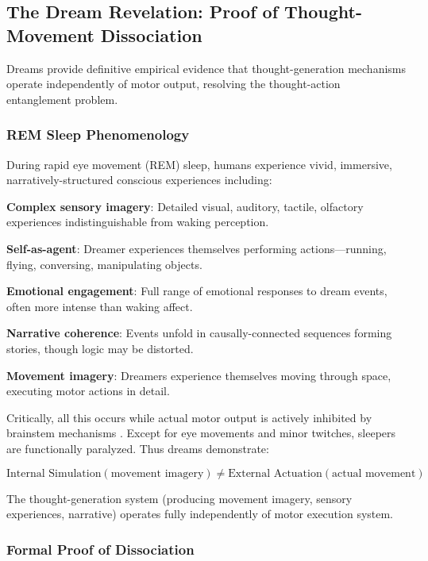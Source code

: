 \documentclass[11pt,onecolumn]{article}
\begin{document}
\subsection{The Dream Revelation: Proof of Thought-Movement Dissociation}

Dreams provide definitive empirical evidence that thought-generation mechanisms operate independently of motor output, resolving the thought-action entanglement problem.

\subsubsection{REM Sleep Phenomenology}

During rapid eye movement (REM) sleep, humans experience vivid, immersive, narratively-structured conscious experiences \citep{hobson2009rem} including:

\textbf{Complex sensory imagery}: Detailed visual, auditory, tactile, olfactory experiences indistinguishable from waking perception.

\textbf{Self-as-agent}: Dreamer experiences themselves performing actions---running, flying, conversing, manipulating objects.

\textbf{Emotional engagement}: Full range of emotional responses to dream events, often more intense than waking affect.

\textbf{Narrative coherence}: Events unfold in causally-connected sequences forming stories, though logic may be distorted.

\textbf{Movement imagery}: Dreamers experience themselves moving through space, executing motor actions in detail.

Critically, all this occurs while actual motor output is actively inhibited by brainstem mechanisms \citep{chase2008control}. Except for eye movements and minor twitches, sleepers are functionally paralyzed. Thus dreams demonstrate:

\begin{equation}
\text{Internal Simulation}(\text{movement imagery}) \neq \text{External Actuation}(\text{actual movement})
\end{equation}

The thought-generation system (producing movement imagery, sensory experiences, narrative) operates fully independently of motor execution system.

\subsubsection{Formal Proof of Dissociation}
\end{document}
